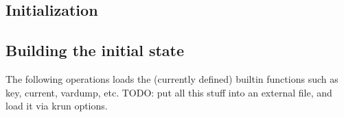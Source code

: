 \documentclass{article}
\begin{document}
\begin{kdefinition}
\begin{module}{}
\begin{kblock}[text]
 \section{Initialization} \end{kblock}
\begin{kblock}[text]
 \subsection{Building the initial state} 
		The following operations loads the (currently defined) builtin functions such as
		key, current, vardump, etc. 
		TODO: put all this stuff into an external file, and load it via krun options. \end{kblock}

\begin{syntaxBlock}{}
\end{syntaxBlock}
\begin{kblock}[text]

\end{kblock}
\end{module}
\end{kdefinition}
\end{document}
